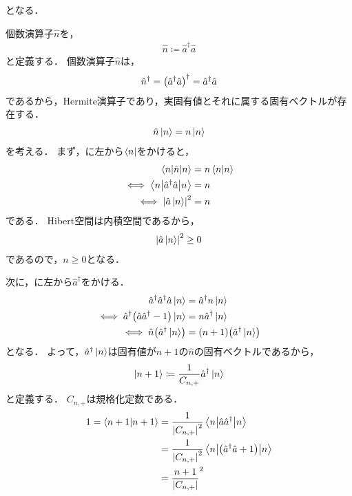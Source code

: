 \documentclass{report}
\begin{document}
    となる．
    \par
    個数演算子$\hat{n}$を，
    \begin{align}
      \hat{n} \coloneqq \hat{a}^{\dag}\hat{a}
    \end{align}
    と定義する．
    個数演算子$\hat{n}$は，
    \begin{align}
      \hat{n}^{\dag} = \qty(\hat{a}^{\dag}\hat{a})^{\dag} = \hat{a}^{\dag}\hat{a}
    \end{align}
    であるから，Hermite演算子であり，実固有値とそれに属する固有ベクトルが存在する．
    \begin{align}
      \hat{n}\ket{n} = n\ket{n}\label{number-operator}
    \end{align}
    を考える．
    まず，に左から$\bra{n}$をかけると，
    \begin{align}
      \mel**{n}{\hat{n}}{n} &= n\braket{n}{n} \\ 
      \iff \mel**{n}{\hat{a}^{\dag}\hat{a}}{n} &= n \\ 
      \iff \abs{\hat{a}\ket{n}}^2 &= n
    \end{align}
    である．
    Hibert空間は内積空間であるから，
    \begin{align}
      \abs{\hat{a}\ket{n}}^2 \geq 0
    \end{align}
    であるので，$n \geq 0$となる．
    \par
    次に，に左から$\hat{a}^{\dag}$をかける．
    \begin{align}
      \hat{a}^{\dag}\hat{a}^{\dag}\hat{a}\ket{n} &= \hat{a}^{\dag}n\ket{n} \\ 
      \iff \hat{a}^{\dag}\qty(\hat{a}\hat{a}^{\dag} - 1)\ket{n} &= n\hat{a}^{\dag}\ket{n} \\ 
      \iff \hat{n}\qty(\hat{a}^{\dag}\ket{n}) &= (n + 1)\qty(\hat{a}^{\dag}\ket{n}) \\ 
    \end{align}
    となる．
    よって，$\hat{a}^{\dag}\ket{n}$は固有値が$n + 1$の$\hat{n}$の固有ベクトルであるから，
    \begin{align}
      \ket{n + 1} &\coloneqq \frac{1}{C_{n, +}}\hat{a}^{\dag}\ket{n} \\ 
    \end{align}
    と定義する．
    $C_{n, +}$は規格化定数である．
    \begin{align}
      1 = \braket{n + 1}{n + 1} &= \frac{1}{\abs{C_{n, +}}^2}\mel**{n}{\hat{a}\hat{a}^{\dag}}{n} \\ 
      &= \frac{1}{\abs{C_{n, +}}^2}\mel**{n}{\qty(\hat{a}^{\dag}\hat{a} + 1)}{n} \\ 
      &= \frac{n + 1}{\abs{C_{n, +}}}^2
    \end{align}
\end{document}
